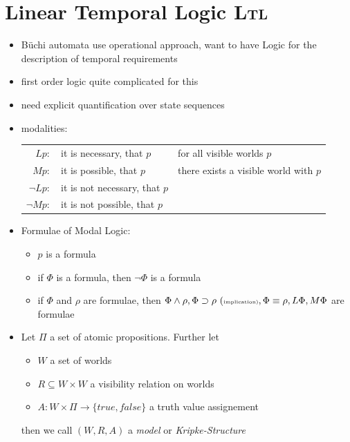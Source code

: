 \documentclass[a4paper, 10pt]{article}
\begin{document}
\section*{Linear Temporal Logic \textsc{Ltl}}
\begin{itemize}
    \item Büchi automata use operational approach, want to have Logic for the description of temporal requirements
    \item first order logic quite complicated for this
    \item[\follows] need explicit quantification over state sequences
    \item modalities:
    \begin{tabular}[t]{rll}
    $Lp:$ & it is necessary, that $p$ & {\tiny for all visible worlds $p$}\\
    $Mp:$ & it is possible, that $p$ & {\tiny there exists a visible world with $p$}\\
    $\neg Lp:$ & it is not necessary, that $p$ & %
    \\
    $\neg Mp:$ & it is not possible, that $p$ & %
    \end{tabular}
    \item Formulae of Modal Logic:
    \begin{itemize}
        \item $p$ is a formula
        \item if $\Phi$ is a formula, then $\neg\Phi$ is a formula
        \item if $\Phi$ and $\rho$ are formulae, then $\Phi\wedge\rho, \Phi\supset\rho \textrm{ (\tiny implication)}, \Phi\equiv\rho, L\Phi, M\Phi$ are formulae
    \end{itemize}
    \item \begin{shaded}
        Let $\Pi$ a set of atomic propositions. Further let
        \begin{itemize}
            \item $W$ a set of worlds
            \item $R\subseteq W\times W$ a visibility relation on worlds
            \item $A: W\times\Pi\to \{true,false\}$ a truth value assignement
        \end{itemize}
        then we call $(W,R,A)$ a \emph{model} or \emph{Kripke-Structure}
    \end{shaded}
\end{itemize}
\end{document}
